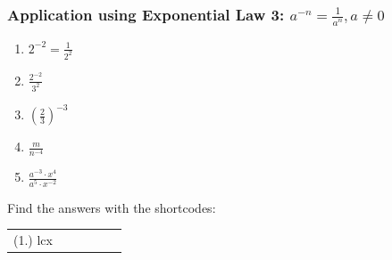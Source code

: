             \subsubsection{  Application using Exponential Law 3: ${a}^{-n}=\frac{1}{{a}^{n}},a\ne 0$ }
            \nopagebreak
        \label{m38359*id64771}\begin{enumerate}[noitemsep, label=\textbf{\arabic*}. ] 
            \label{m38359*uid18}\item 
            \begin{math}{2}^{-2}=\frac{1}{{2}^{2}}\end{math}
      \label{m38359*uid19}\item 
        \begin{math}\frac{{2}^{-2}}{{3}^{2}}\end{math}
      \label{m38359*uid20}\item 
        \begin{math}{\left(\frac{2}{3}\right)}^{-3}\end{math}
      \label{m38359*uid21}\item 
        \begin{math}\frac{m}{{n}^{-4}}\end{math}
      \label{m38359*uid22}\item 
        \begin{math}\frac{{a}^{-3}\ensuremath{\cdot}{x}^{4}}{{a}^{5}\ensuremath{\cdot}{x}^{-2}}\end{math}
\newline
\newline
          \end{enumerate}
      \label{m38359*uid23}
\par {} Find the answers with the shortcodes:
 \par \begin{tabular}[h]{cccccc}
 (1.) lcx  & \end{tabular}
